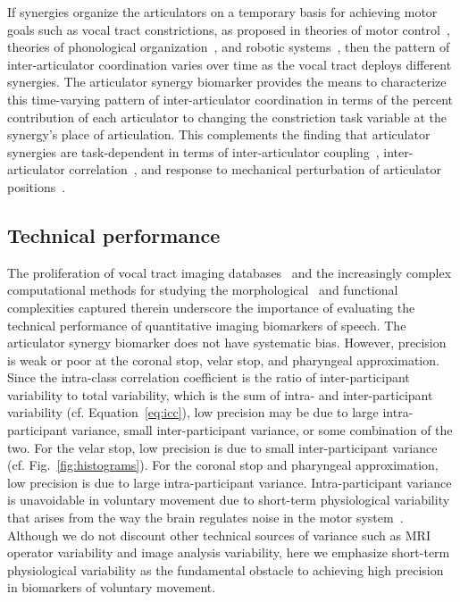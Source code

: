 \documentclass[preprint]{JASAnew}\usepackage[]{graphicx}\usepackage[]{color}
\begin{document}
If synergies organize the articulators on a temporary basis for achieving motor goals such as vocal tract constrictions, as proposed in theories of motor control~\citep{turvey1977preliminaries, saltzman1987skilled}, theories of phonological organization~\citep{browman1986towards, browman1989articulatory}, and robotic systems~\citep{herbort2010sure}, then the pattern of inter-articulator coordination varies over time as the vocal tract deploys different synergies. 
%
The articulator synergy biomarker provides the means to characterize this time-varying pattern of inter-articulator coordination in terms of the percent contribution of each articulator to changing the constriction task variable at the synergy's place of articulation. 
%
This complements the finding that articulator synergies are task-dependent in terms of inter-articulator coupling~\citep{lancia2018coupling}, inter-articulator correlation~\citep{jackson2009statistical}, and response to mechanical perturbation of articulator positions~\citep{kelso1984functionally}.


\subsection{Technical performance}

The proliferation of vocal tract imaging databases~\citep{narayanan2014real,sorensen2017database} and the increasingly complex computational methods for studying the morphological~\citep{lammert2013morphological} and functional~\citep{dawson2016methods} complexities captured therein underscore the importance of evaluating the technical performance of quantitative imaging biomarkers of speech. 
%
The articulator synergy biomarker does not have systematic bias. However, precision is weak or poor at the coronal stop, velar stop, and pharyngeal approximation. 
%
Since the intra-class correlation coefficient is the ratio of inter-participant variability to total
variability, which is the sum of intra- and inter-participant variability (cf. Equation~\ref{eq:icc}), low precision may be due to large intra-participant variance, small inter-participant variance, or some combination of the two. 
%
For the velar stop, low precision is due to small inter-participant variance (cf. Fig.~\ref{fig:histograms}). 
%
For the coronal stop and pharyngeal approximation, low precision is due to large intra-participant variance.
%
Intra-participant variance is unavoidable in voluntary movement due to short-term physiological variability that arises from the way the brain regulates noise in the motor system~\citep{harris1998signal,van2009motor,wu2014temporal}. 
%
Although we do not discount other technical sources of variance such as MRI operator variability and image analysis variability, here we emphasize short-term physiological variability as the fundamental obstacle to achieving high precision in biomarkers of voluntary movement.
\end{document}
